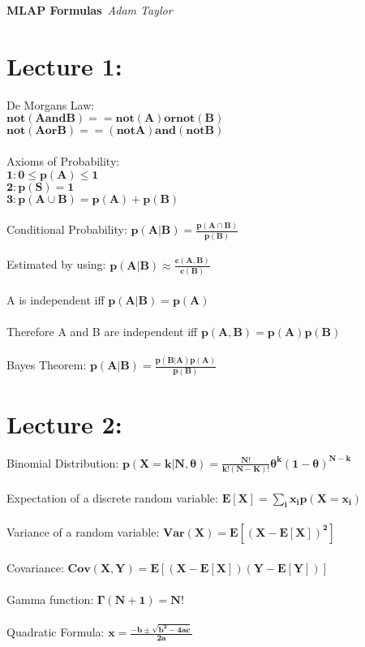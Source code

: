 \documentclass{article}
\begin{document}
\begin{center}
\Large\textbf{MLAP Formulas}\
\large\textit{Adam Taylor}
\newline
\end{center}
\section{Lecture 1:}
De Morgans Law:\\ $\mathbf{not(A and B) == not(A) or not(B)}$\\
$\mathbf{not(A or B) == (not A) and (not B)}$\\\\
Axioms of Probability:\\ $\mathbf{1: 0 \leq p(A) \leq 1}$\\
$\mathbf{2: p(S) = 1}$\\
$\mathbf{3: p(A \cup B ) = p(A) + p(B)}$\\\\
Conditional Probability: $\mathbf {p(A|B) = \frac{p(A\cap B)}{p(B)}}$\\\\
Estimated by using: $\mathbf{p(A|B) \approx \frac{c(A,B)}{c(B)}}$\\\\
A is independent iff $\mathbf{p(A|B) = p(A)}$\\\\
Therefore A and B are independent iff $\mathbf{p(A,B) = p(A)p(B)}$\\\\
Bayes Theorem: $\mathbf{p(A|B) = \frac{p(B|A)p(A)}{p(B)}}$
\section{Lecture 2:}
Binomial Distribution: $\mathbf{p(X = k|N, \theta) = \frac{N!}{k!(N-K)!}\theta^k(1-\theta)^{N-k}}$\\\\
Expectation of a discrete random variable: $\mathbf{E[X] = \sum\limits_{i}^{} x_ip(X=x_i)}$\\\\
Variance of a random variable: $\mathbf{Var(X) = E[(X-E[X])^2]}$\\\\
Covariance: $\mathbf{Cov(X,Y) = E[(X-E[X])(Y-E[Y])]}$\\\\
Gamma function: $\mathbf{\Gamma (N+1) = N!}$\\\\
Quadratic Formula: $\mathbf{x = \frac{-b\pm\sqrt{b^2 - 4ac}}{2a}}$
\end{document}
